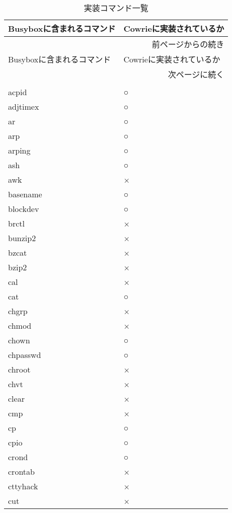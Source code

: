 \begin{longtable}{p{40mm}p{40mm}}
  \caption{実装コマンド一覧}
  \label{table:command} \\
  \hline
  Busyboxに含まれるコマンド & Cowrieに実装されているか \\ \hline\hline
  \endfirsthead
  \multicolumn{2}{r}{前ページからの続き} \\ \hline
  Busyboxに含まれるコマンド & Cowrieに実装されているか \\ \hline\hline
  \endhead
  \hline
  \multicolumn{2}{r}{次ページに続く} \\
  \endfoot
  \hline
  \multicolumn{2}{r}{以上} \\
  \endlastfoot
acpid & ○ \\ \hline
adjtimex &  ○ \\ \hline
ar &  ○ \\ \hline
arp & ○ \\ \hline
arping &  ○ \\ \hline
ash & ○ \\ \hline
awk & × \\ \hline
basename &  ○ \\ \hline
blockdev &  ○ \\ \hline
brctl & × \\ \hline
bunzip2 & × \\ \hline
bzcat & × \\ \hline
bzip2 & × \\ \hline
cal & × \\ \hline
cat & ○ \\ \hline
chgrp & × \\ \hline
chmod & × \\ \hline
chown & ○ \\ \hline
chpasswd &  ○ \\ \hline
chroot & × \\ \hline
chvt & × \\ \hline
clear & × \\ \hline
cmp & × \\ \hline
cp &  ○ \\ \hline
cpio &  ○ \\ \hline
crond & ○ \\ \hline
crontab & × \\ \hline
cttyhack & × \\ \hline
cut & × \\ \hline

\end{longtable}
